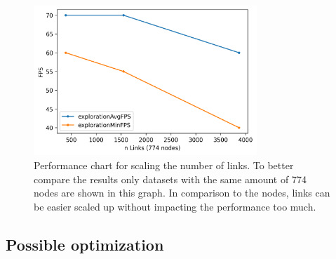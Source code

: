 \begin{figure}[!hbt]
    \centering
    \includegraphics[width=0.75\textwidth]{graphics/performanceAnalysisLinks2.png}
    \caption{Performance chart for scaling the number of links. To better compare the results only datasets with the same amount of 774 nodes are shown in this graph. In comparison to the nodes, links can be easier scaled up without impacting the performance too much.} 
    \label{fig:performanceLinks} 
\end{figure}

\subsection{Possible optimization}

